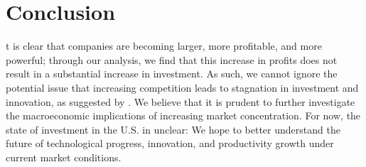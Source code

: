 \section{Conclusion}


t is clear that companies are becoming larger, more profitable, and more powerful; through our analysis, we find that this increase in profits does not result in a substantial increase in investment. As such, we cannot ignore the potential issue that increasing competition leads to stagnation in investment and innovation, as suggested by \cite[Alesina et al., 2005]{Alesina2005}. We believe that it is prudent to further investigate the macroeconomic implications of increasing market concentration. For now, the state of investment in the U.S. in unclear: We hope to better understand the future of technological progress, innovation, and productivity growth under current market conditions.

